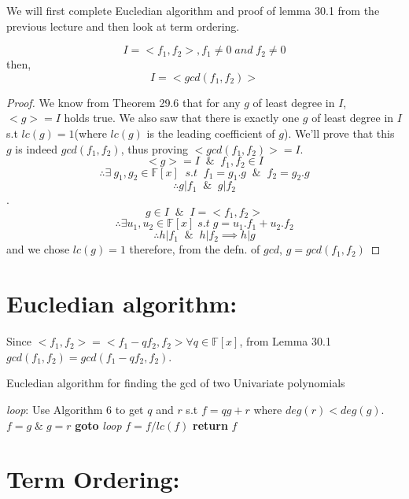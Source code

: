 We will first complete Eucledian algorithm and proof of lemma 30.1 from the previous lecture and then look at term ordering.
\begin{lemma}
$$I = <f_1, f_2>, f_1 \neq 0\;and\;f_2\neq 0$$
then,$$I=<gcd(f_1,f_2)>$$
\end{lemma}
\begin{proof}
We know from Theorem 29.6 that for any $g$ of least degree in $I$, $<g>=I$ holds true. We also saw that there is exactly one $g$ of least degree in $I$ s.t $lc(g)=1$(where $lc(g)$ is the leading coefficient of $g$). We'll prove that this $g$ is indeed $gcd(f_{1},f_{2})$, thus proving $<gcd(f_{1},f_{2})>=I$.
$$<g>=I\;\;\&\;\;f_{1},f_{2}\in I$$ 
$$\therefore \exists\ g_{1},g_{2}\in \mathbb{F}[x]\;\;s.t\;\;f_{1}=g_{1}.g\;\;\&\;\;f_{2}=g_{2}.g$$ 
$$\therefore g|f_{1}\;\;\&\;\;g|f_{2}$$.
$$g\in I\;\;\&\;\;I=<f_{1},f_{2}>$$
$$\therefore\exists u_{1},u_{2}\in \mathbb{F}[x]\;s.t\;g=u_{1}.f_{1}+u_{2}.f_{2}$$
$$\therefore h|f_{1}\;\;\&\;\;h|f_{2} \implies h|g$$
and we chose $lc(g)=1$
therefore, from the defn. of $gcd$, $g=gcd(f_{1},f_{2})$
\end{proof}
\section*{Eucledian algorithm:}
Since $<f_{1},f_{2}>=<f_{1}-qf_{2},f_{2}>\forall q\in \mathbb{F}[x]$, from Lemma 30.1  $gcd(f_{1},f_{2})=gcd(f_{1}-qf_{2},f_{2})$.
\begin{algorithm}
\caption{Eucledian algorithm for finding the gcd of two Univariate polynomials}\label{div-euclid}
\begin{algorithmic}[1]
\State \emph{loop}:
\State Use Algorithm 6 to get $q$ and $r$ s.t $f=qg+r$ where $deg(r)< deg(g)$.
\State $f=g\;\&\;g=r$
\State \textbf{goto} \emph{loop}
\EndIf
\State $f=f/lc(f)$
\State \textbf{return} $f$
\EndProcedure
\end{algorithmic}
\end{algorithm}
\section*{Term Ordering:}

